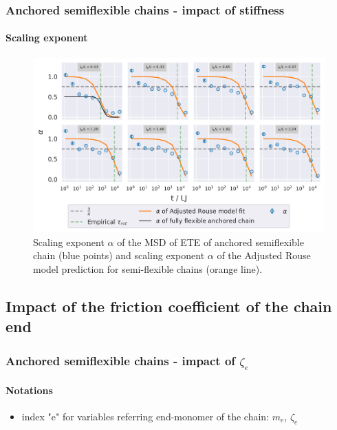\documentclass[handout]{beamer}
\begin{document}
\begin{frame}
    \frametitle{Anchored semiflexible chains - impact of stiffness}
    \framesubtitle{Scaling exponent}
    \begin{figure}[h]
        \begin{center}
          \includegraphics[width=\columnwidth,trim={0cm 0cm 0cm 0.0cm},clip]{4-exp-delta_R-rouse_fit-tau-a_alpha.png}
          \caption{\label{fig:alpha_anchored_l_K}
          Scaling exponent $\alpha$ of the MSD of ETE of anchored semiflexible chain (blue points) and 
          scaling exponent $\alpha$ of the Adjusted Rouse model prediction for semi-flexible chains 
          (orange line).
          }
        \end{center}
    \end{figure}
\end{frame}

\subsection{Impact of the friction coefficient of the chain end}


\begin{frame}
    \frametitle{Anchored semiflexible chains - impact of $\zeta_e$}
    \framesubtitle{Notations}
    \begin{itemize}
        \item index "e" for variables referring end-monomer of the chain: $m_e$, $\zeta_e$ 
    \end{itemize}
\end{frame}

\end{document}
